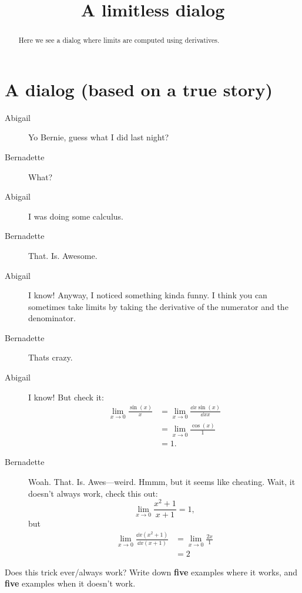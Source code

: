 \documentclass{ximera}
\title[Break-Ground:]{A limitless dialog}
\begin{document}
\begin{abstract}
Here we see a dialog where limits are computed using derivatives.
\end{abstract}
\maketitle

\section{A dialog (based on a true story)}

\begin{description}
\item[Abigail] Yo Bernie, guess what I did last night?
\item[Bernadette] What?
\item[Abigail] I was doing some calculus.
\item[Bernadette] That. Is. Awesome.
\item[Abigail] I know! Anyway, I noticed something kinda funny. I
  think you can sometimes take limits by taking the derivative of the
  numerator and the denominator.
\item[Bernadette] Thats crazy.
\item[Abigail] I know! But check it:
  \begin{align*}
    \lim_{x\to 0} \frac{\sin(x)}{x} &= \lim_{x\to 0} \frac{\dd{x}\sin(x)}{\dd{x}x}\\
    &= \lim_{x\to 0} \frac{\cos(x)}{1}\\
    &=1.
  \end{align*}
  \item[Bernadette] Woah. That. Is. Awes---weird. Hmmm, but it seems like
    cheating. Wait, it doesn't always work, check this out:
    \[
    \lim_{x\to 0} \frac{x^2+1}{x+1} = 1,
    \]
    but
    \begin{align*}
      \lim_{x\to 0} \frac{\dd{x}\left(x^2+1\right)}{\dd{x}\left(x+1\right)} &=
      \lim_{x\to 0} \frac{2x}{1} \\
      &=2
    \end{align*}
\end{description}

\begin{problem}
  Does this trick ever/always work? Write down \textbf{five} examples
  where it works, and \textbf{five} examples when it doesn't work.
  \begin{freeResponse}
\end{freeResponse}
\end{problem}
\end{document}

